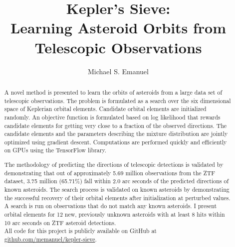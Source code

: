 \documentclass[11pt]{gsasthesis} %
\begin{document}
\title{Kepler's Sieve: \\Learning Asteroid Orbits from Telescopic Observations} %
\author{Michael S. Emanuel} %





\begin{abstract}
A novel method is presented to learn the orbits of asteroids from a large data set of telescopic observations.
The problem is formulated as a search over the six dimensional space of Keplerian orbital elements.
Candidate orbital elements are initialized randomly.
An objective function is formulated based on log likelihood that rewards candidate elements for getting 
very close to a fraction of the observed directions.
The candidate elements and the parameters describing the mixture distribution are jointly optimized using gradient descent.
Computations are performed quickly and efficiently on GPUs using the TensorFlow library.

The methodology of predicting the directions of telescopic detections is validated by demonstrating 
that out of approximately 5.69 million observations from the ZTF dataset,
3.75 million (65.71\%) fall within 2.0 arc seconds of the predicted directions of known asteroids.
The search process is validated on known asteroids by demonstrating the successful recovery 
of their orbital elements after initialization at perturbed values.
A search is run on observations that do not match any known asteroids.
I present orbital elements for 12 new, previously unknown asteroids
with at least 8 hits within 10 arc seconds on ZTF asteroid detections.\\
All code for this project is publicly available on GitHub at \href{https://github.com/memanuel/kepler-sieve}{github.com/memanuel/kepler-sieve}.

\end{abstract}
\end{document}
